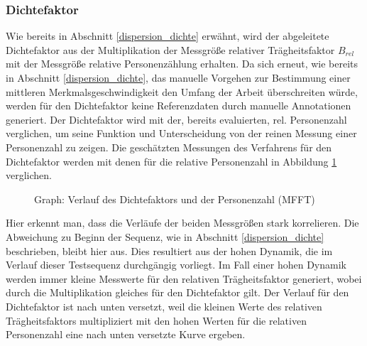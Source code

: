\subsubsection{Dichtefaktor}
Wie bereits in Abschnitt \ref{dispersion_dichte} erwähnt, wird der abgeleitete Dichtefaktor aus der Multiplikation der Messgröße relativer Trägheitsfaktor $B_{rel}$ mit der Messgröße relative Personenzählung erhalten. Da sich erneut, wie bereits in Abschnitt \ref{dispersion_dichte}, das manuelle Vorgehen zur Bestimmung einer mittleren Merkmalsgeschwindigkeit den Umfang der Arbeit überschreiten würde, werden für den Dichtefaktor keine Referenzdaten durch manuelle Annotationen generiert. Der Dichtefaktor wird mit der, bereits evaluierten, rel. Personenzahl verglichen, um seine Funktion und Unterscheidung von der reinen Messung einer Personenzahl zu zeigen. Die geschätzten Messungen des Verfahrens für den Dichtefaktor werden mit denen für die relative Personenzahl in Abbildung \ref{business:dichte} verglichen.

\newpage
\begin{figure}[h]
  \centering
  \caption{Graph: Verlauf des Dichtefaktors und der Personenzahl (MFFT) \cite{AliS07}}
  \label{business:dichte}
\end{figure}
Hier erkennt man, dass die Verläufe der beiden Messgrößen stark korrelieren. Die Abweichung zu Beginn der Sequenz, wie in Abschnitt \ref{dispersion_dichte} beschrieben, bleibt hier aus. Dies resultiert aus der hohen Dynamik, die im Verlauf dieser Testsequenz durchgängig vorliegt. Im Fall einer hohen Dynamik werden immer kleine Messwerte für den relativen Trägheitsfaktor generiert, wobei durch die Multiplikation gleiches für den Dichtefaktor gilt. Der Verlauf für den Dichtefaktor ist nach unten versetzt, weil die kleinen Werte des relativen Trägheitsfaktors multipliziert mit den hohen Werten für die relativen Personenzahl eine nach unten versetzte Kurve ergeben.

